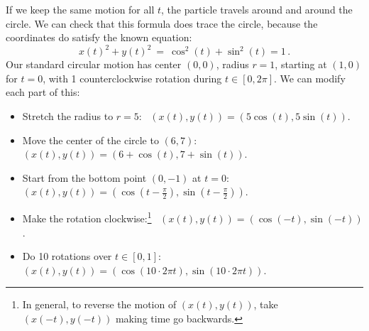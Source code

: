 \documentclass[11pt]{article}
\begin{document}
\noindent
If we keep the same motion for all $t$, the particle 
travels around and around the circle.
We can check that this formula does trace the circle, because
the coordinates do satisfy the known equation:
$$
x(t)^2 + y(t)^2 \ =\ \cos^2(t) + \sin^2(t) = 1\,.
$$
Our standard circular motion has center $(0,0)$, radius $r=1$, 
starting at $(1,0)$ for $t=0$, 
with 1 counterclockwise rotation during $t\in[0,2\pi]$.
We can modify each part of this:
\begin{itemize}
\item Stretch the radius to $r=5$:
\ 
$(x(t), y(t)) = (5\cos(t), 5\sin(t))$. 

\item Move the center of the circle to $(6,7)$: 
\ 
$(x(t), y(t)) = (6+\cos(t), 7+\sin(t))$. 

\item Start from the bottom point $(0,-1)$ at $t=0$:
$(x(t), y(t)) = (\cos(t{-}\frac\pi2), \sin(t{-}\frac\pi2))$. 

\item Make the rotation clockwise:\footnote{
In general, to reverse the motion of $(x(t),y(t))$, take $(x(-t), y(-t))$
making time go backwards.
}
\ 
$(x(t), y(t)) = (\cos(-t), \sin(-t))$. 

\item Do 10 rotations over $t\in[0,1]$: \
$(x(t),y(t))= (\cos(10{\cdot}2\pi t),\sin(10{\cdot}2\pi  t))$.
\\[-.5em]

\end{itemize}
\end{document}
